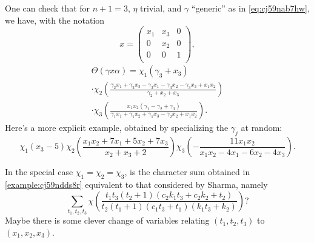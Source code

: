 \documentclass[reqno]{amsart} 
\begin{document}
\begin{example}\label{example:cj59ndds8r}
  One can check that for $n+1=3$, $\eta$ trivial, and $\gamma$ ``generic'' as in \eqref{eq:cj59nab7hw}, we have, with the notation
  \begin{equation*}
x =
\begin{pmatrix}
x_1 & x_3 & 0 \\
0 & x_2 & 0 \\
0 & 0 & 1 \\
\end{pmatrix},
\end{equation*}
  \begin{multline*}
    \Theta(\gamma x \alpha) =
    \chi_1 \left(
      \gamma_{3} + x_{3}
    \right)
    \\ \cdot 
    \chi_2 \left(
      \frac{\gamma_{2} x_{1} + \gamma_{2} x_{3} - \gamma_{3} x_{1} - \gamma_{3} x_{2} - \gamma_{3} x_{3} + x_{1} x_{2}}{\gamma_{2} + x_{2} + x_{3}}
    \right)
    \\ \cdot 
    \chi_3
    \left(
      \frac{x_{1} x_{2} (\gamma_{1} - \gamma_{2} + \gamma_{3})}{\gamma_{1} x_{1} + \gamma_{1} x_{2} + \gamma_{1} x_{3} - \gamma_{2} x_{2} + x_{1} x_{2}}
    \right).
  \end{multline*}
  Here's a more explicit example, obtained by specializing the $\gamma_j$ at random:
  \begin{equation*}
\chi_1 \left(
    x_{3} - 5
  \right)
  \chi_2 \left(
    \frac{x_{1} x_{2} + 7 x_{1} + 5 x_{2} + 7 x_{3}}{x_{2} + x_{3} + 2}\right)
  \chi_3 \left(
  - \frac{11 x_{1} x_{2}}{x_{1} x_{2} - 4 x_{1} - 6 x_{2} - 4 x_{3}}\right).
\end{equation*}
\end{example}

\begin{question}
  In the special case $\chi_1 = \chi_2 = \chi_3$, is the character sum obtained in \ref{example:cj59ndds8r} equivalent to that considered by Sharma, namely
  \begin{equation*}
    \sum_{t_1, t_2, t_3 }
    \chi \left( \frac{t_{1} t_{3} (t_{2} + 1) (c_{2} k_{1} t_{3} + c_{2} k_{2} + t_{2})}{t_{2} (t_{1} + 1) (c_{1} t_{3} + t_{1}) (k_{1} t_{3} + k_{2})} \right)?
  \end{equation*}
  Maybe there is some clever change of variables relating $(t_1, t_2 , t_3 )$ to $(x_1 , x_2 , x_3 )$.
\end{question}




\end{document}
